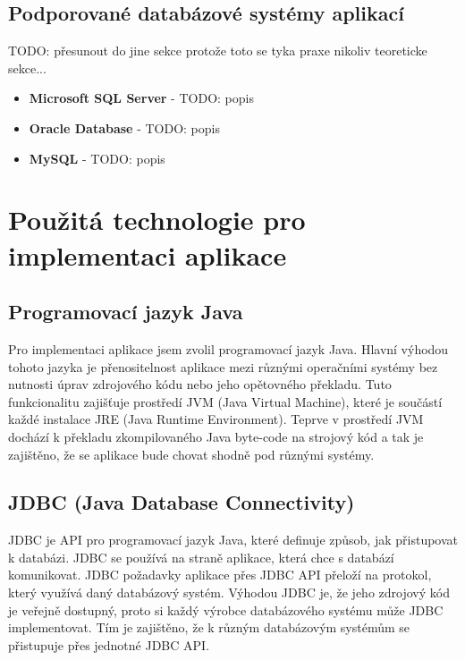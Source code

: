 \documentclass[czech,bachelor,public,dept460,male,cpdeclaration,twoside]{diploma}
\begin{document}
\subsection{Podporované databázové systémy aplikací}
TODO: přesunout do jine sekce protože toto se tyka praxe nikoliv teoreticke sekce...
\begin{itemize}
  \item \textbf{Microsoft SQL Server} - TODO: popis
  \item \textbf{Oracle Database} - TODO: popis
  \item \textbf{MySQL} - TODO: popis
\end{itemize}



\section{Použitá technologie pro implementaci aplikace} \label{tech}

\subsection{Programovací jazyk Java}
Pro implementaci aplikace jsem zvolil programovací jazyk Java. Hlavní výhodou tohoto jazyka je přenositelnost aplikace mezi různými operačními systémy bez nutnosti úprav zdrojového kódu nebo jeho opětovného překladu. Tuto funkcionalitu zajišťuje prostředí JVM (Java Virtual Machine), které je součástí každé instalace JRE (Java Runtime Environment). Teprve v prostředí JVM dochází k překladu zkompilovaného Java byte-code na strojový kód a tak je zajištěno, že se aplikace bude chovat shodně pod různými systémy.

\subsection{JDBC (Java Database Connectivity)} \label{jdbc}
JDBC je API pro programovací jazyk Java, které definuje způsob, jak přistupovat k databázi. JDBC se používá na straně aplikace, která chce s databází komunikovat. JDBC požadavky aplikace přes JDBC API přeloží na protokol, který využívá daný databázový systém. Výhodou JDBC je, že jeho zdrojový kód je veřejně dostupný, proto si každý výrobce databázového systému může JDBC implementovat. Tím je zajištěno, že k různým databázovým systémům se přistupuje přes jednotné JDBC API.
\end{document}
